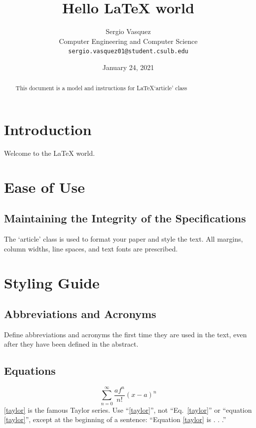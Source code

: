 \documentclass{article}
\begin{document}
\title{Hello \LaTeX\xspace world}

\author{Sergio Vasquez\\
\small{Computer Engineering and Computer Science}\\
\small{\texttt{sergio.vasquez01@student.csulb.edu}}}
\date{January 24, 2021}

\maketitle

\begin{abstract}
This document is a model and instructions for \LaTeX\xspace `article' class
\end{abstract}

\section{Introduction}
Welcome to the \LaTeX\xspace world.
\section{Ease of Use}

\subsection{Maintaining the Integrity of the Specifications}
The `article' class is used to format your paper and style the text. All margins, column widths, line spaces, and text fonts are prescribed.

\section{Styling Guide}

\subsection{Abbreviations and Acronyms}
Define abbreviations and acronyms the first time they are used in the text, 
even after they have been defined in the abstract.

\subsection{Equations}
\begin{equation}
\sum_{n=0}^{\infty}\frac{af^{n}}{n!}(x-a)^n
\label{taylor}
\end{equation}
\eqref{taylor} is the famous Taylor series. Use ``\eqref{taylor}'', not ``Eq.~\eqref{taylor}'' or ``equation \eqref{taylor}'', except at the beginning of a sentence: ``Equation \eqref{taylor} is . . .''
\end{document}
